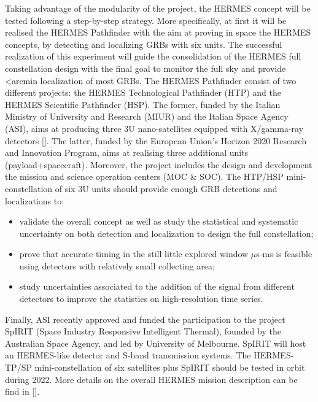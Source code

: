 \documentclass[]{spie}  %
\begin{document}
Taking advantage of the modularity of the project, the HERMES concept will be tested following a step-by-step strategy. More specifically, at first it will be realised the HERMES Pathfinder with the aim at proving in space the HERMES concepts, by detecting and localizing GRBs with six units. The successful realization of this experiment will guide the consolidation of the HERMES full constellation design with  the final goal to monitor the full sky and provide <arcmin localization of most GRBs.
The HERMES Pathfinder consist of two different projects: the HERMES Technological Pathfinder (HTP) and the HERMES Scientific Pathfinder (HSP). The former, funded by the Italian Ministry of University and Research (MIUR) and the Italian Space Agency (ASI), aims at producing three 3U nano-satellites equipped with X/gamma-ray detectors []. The latter, funded by the European Union’s Horizon 2020 Research and Innovation Program, aims at realising three additional units (payload+spacecraft). Moreover, the project includes the design and development the mission and science operation centers (MOC \& SOC). 
The HTP/HSP mini-constellation of six 3U units should provide enough GRB detections and localizations to:
\begin{itemize}
	\item validate the overall concept as well as study the statistical and systematic uncertainty on both detection and localization to design the full constellation;\\ 
	\item prove that accurate timing in the still little explored window $\mu$s-ms is feasible using detectors with relatively small collecting area;\\
	\item study uncertainties associated to the addition of the signal from different detectors to improve the statistics on high-resolution time series. 
\end{itemize}

Finally, ASI recently approved and funded the participation to the project SpIRIT (Space Industry Responsive Intelligent Thermal), founded by the Australian Space Agency, and led by University of Melbourne. SpIRIT will host an HERMES-like detector and S-band transmission systems. The HERMES-TP/SP mini-constellation of six satellites plus SpIRIT should be tested in orbit during 2022. More details on the overall HERMES mission description can be find in [].
\end{document}
